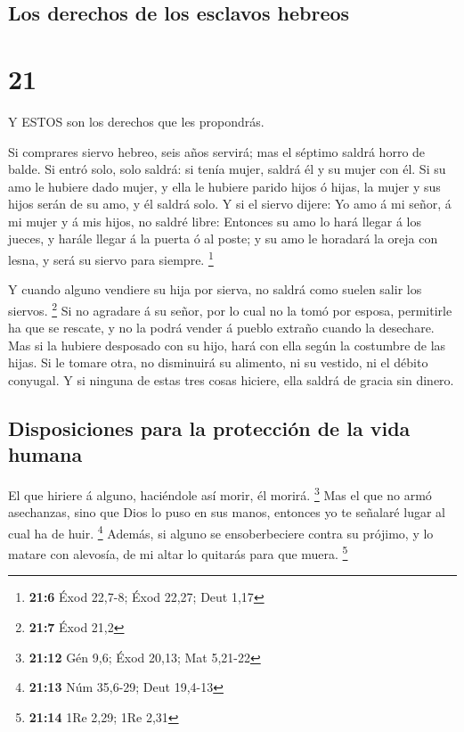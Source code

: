 \hypertarget{los-derechos-de-los-esclavos-hebreos}{%
\subsection{Los derechos de los esclavos
hebreos}\label{los-derechos-de-los-esclavos-hebreos}}

\hypertarget{section-20}{%
\section{21}\label{section-20}}

 Y ESTOS son los derechos que les propondrás.

 Si comprares siervo hebreo, seis años servirá; mas el
séptimo saldrá horro de balde.  Si entró solo, solo saldrá:
si tenía mujer, saldrá él y su mujer con él.  Si su amo le
hubiere dado mujer, y ella le hubiere parido hijos ó hijas, la mujer y
sus hijos serán de su amo, y él saldrá solo.  Y si el siervo
dijere: Yo amo á mi señor, á mi mujer y á mis hijos, no saldré libre:
 Entonces su amo lo hará llegar á los jueces, y harále
llegar á la puerta ó al poste; y su amo le horadará la oreja con lesna,
y será su siervo para siempre. \footnote{\textbf{21:6} Éxod 22,7-8; Éxod
  22,27; Deut 1,17}

 Y cuando alguno vendiere su hija por sierva, no saldrá como
suelen salir los siervos. \footnote{\textbf{21:7} Éxod 21,2}
 Si no agradare á su señor, por lo cual no la tomó por
esposa, permitirle ha que se rescate, y no la podrá vender á pueblo
extraño cuando la desechare.  Mas si la hubiere desposado
con su hijo, hará con ella según la costumbre de las hijas.
 Si le tomare otra, no disminuirá su alimento, ni su
vestido, ni el débito conyugal.  Y si ninguna de estas tres
cosas hiciere, ella saldrá de gracia sin dinero.

\hypertarget{disposiciones-para-la-protecciuxf3n-de-la-vida-humana}{%
\subsection{Disposiciones para la protección de la vida
humana}\label{disposiciones-para-la-protecciuxf3n-de-la-vida-humana}}

 El que hiriere á alguno, haciéndole así morir, él morirá.
\footnote{\textbf{21:12} Gén 9,6; Éxod 20,13; Mat 5,21-22} 
Mas el que no armó asechanzas, sino que Dios lo puso en sus manos,
entonces yo te señalaré lugar al cual ha de huir. \footnote{\textbf{21:13}
  Núm 35,6-29; Deut 19,4-13}  Además, si alguno se
ensoberbeciere contra su prójimo, y lo matare con alevosía, de mi altar
lo quitarás para que muera. \footnote{\textbf{21:14} 1Re 2,29; 1Re 2,31}


